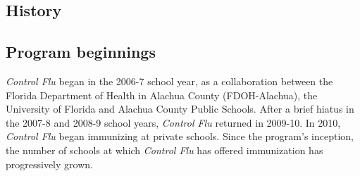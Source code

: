 \documentclass{article}
\begin{document}
\begin{center}
\section*{History}
\end{center}
\begin{multicols}{2}




\subsection*{Program beginnings}

\emph{Control Flu} began in the 2006-7 school year, as a collaboration between the Florida Department of Health in Alachua County (FDOH-Alachua), the University of Florida and Alachua County Public Schools.  After a brief hiatus in the 2007-8 and 2008-9 school years, \emph{Control Flu} returned in 2009-10. In 2010, \emph{Control Flu} began immunizing at private schools.  Since the program's inception, the number of schools at which \emph{Control Flu} has offered immunization has progressively grown.


% 
% 
% 










\end{multicols}
\end{document}
